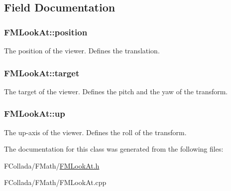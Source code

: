 \subsection{Field Documentation}
\hypertarget{classFMLookAt_ac6a935d152b60654e88e0d1eca5eaf75}{
\subsubsection[{position}]{ {\bf FMLookAt::position}}}
\label{classFMLookAt_ac6a935d152b60654e88e0d1eca5eaf75}
The position of the viewer. Defines the translation. \hypertarget{classFMLookAt_a1921262a8c2d6074189fc9b3c4da2dcf}{
\subsubsection[{target}]{ {\bf FMLookAt::target}}}
\label{classFMLookAt_a1921262a8c2d6074189fc9b3c4da2dcf}
The target of the viewer. Defines the pitch and the yaw of the transform. \hypertarget{classFMLookAt_aad5d1c7f21b35add5956972669befd6e}{
\subsubsection[{up}]{ {\bf FMLookAt::up}}}
\label{classFMLookAt_aad5d1c7f21b35add5956972669befd6e}
The up-\/axis of the viewer. Defines the roll of the transform. 

The documentation for this class was generated from the following files:\begin{DoxyCompactItemize}
\item 
FCollada/FMath/\hyperlink{FMLookAt_8h}{FMLookAt.h}\item 
FCollada/FMath/FMLookAt.cpp\end{DoxyCompactItemize}
